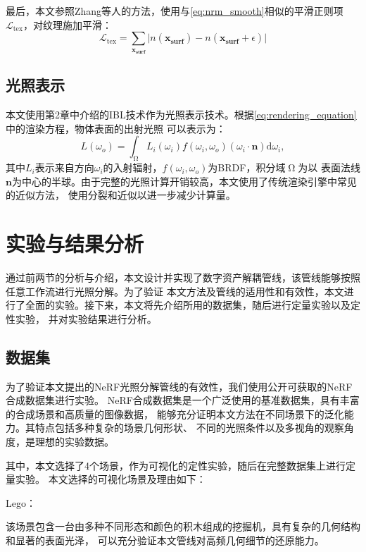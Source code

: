 最后，本文参照Zhang等人\cite{zhang2021nerfactor}的方法，使用与\ref{eq:nrm_smooth}相似的平滑正则项$\mathcal{L}_\text{tex}$，对纹理施加平滑：
\begin{equation}
  \label{eq:tex_smooth}
  \mathcal{L}_{\text{tex}} = \sum_{\mathbf{x_\text{surf}}} {\lvert {n({\mathbf{x_\text{surf}}})} - {n({\mathbf{x_\text{surf}}}+\epsilon)}\rvert}
\end{equation}


\subsection{光照表示}
本文使用第2章中介绍的IBL技术作为光照表示技术。根据\eqref{eq:rendering_equation}中的渲染方程，物体表面的出射光照
可以表示为：
\begin{equation}
  \label{eq:radiance}
  L\left(\omega_o\right)=\int_{\upOmega} L_i\left(\omega_i\right)f\left(\omega_i,\omega_o\right)\left(\omega_i\cdot\mathbf{n}\right)\mathrm{d}\omega_i,
\end{equation}
其中$L_i$表示来自方向$\omega_i$的入射辐射，$f\left(\omega_i,\omega_o\right)$为BRDF，积分域$\upOmega$为以
表面法线$\mathbf{n}$为中心的半球。由于完整的光照计算开销较高，本文使用了传统渲染引擎中常见的近似方法\cite{Hill_2014}，
使用分裂和近似以进一步减少计算量。

\section{实验与结果分析}
通过前两节的分析与介绍，本文设计并实现了数字资产解耦管线，该管线能够按照任意工作流进行光照分解。为了验证
本文方法及管线的适用性和有效性，本文进行了全面的实验。接下来，本文将先介绍所用的数据集，随后进行定量实验以及定性实验，
并对实验结果进行分析。
\subsection{数据集}

为了验证本文提出的NeRF光照分解管线的有效性，我们使用公开可获取的NeRF合成数据集进行实验。
NeRF合成数据集是一个广泛使用的基准数据集，具有丰富的合成场景和高质量的图像数据，
能够充分证明本文方法在不同场景下的泛化能力。其特点包括多种复杂的场景几何形状、
不同的光照条件以及多视角的观察角度，是理想的实验数据。

其中，本文选择了4个场景，作为可视化的定性实验，随后在完整数据集上进行定量实验。
本文选择的可视化场景及理由如下：

 Lego：

该场景包含一台由多种不同形态和颜色的积木组成的挖掘机，具有复杂的几何结构和显著的表面光泽，
可以充分验证本文管线对高频几何细节的还原能力。

